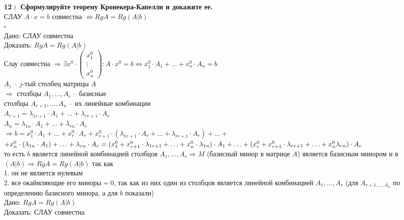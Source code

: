 \documentclass[a4paper,12pt]{article}
\newcommand*{\hm}[1]{#1\nobreak\discretionary{}
{\hbox{$\mathsurround=0pt #1$}}{}}
\begin{document}
    \textbf{12$\left.\right)$ Сформулируйте теорему Кронекера-Капелли и докажите ее.}\\
    СЛАУ $A\cdot x=b$ совместна $\Leftrightarrow RgA=Rg(A|b)$\\
    $\square$\\
    Дано: СЛАУ совместна\\
    Доказать: $RgA=Rg(A|b)$\\
    Слау совместна $\Rightarrow\exists x^0\cdot\begin{pmatrix}
                                                   x_1^0  \\
                                                   \vdots \\
                                                   x_n^0
    \end{pmatrix}: A\cdot x^0=b\Leftrightarrow x_1^0\cdot A_1+\ldots+x_n^0\cdot A_n=b$\\
    $A_j$ -- $j$-тый столбец матрицы $A$\\
    $\Rightarrow$ столбцы $A_1, \ldots, A_r$ -- базисные\\
    столбцы $A_{r+1},\ldots, A_n$ -- их линейные комбинации\\
    $A_{r+1}=\lambda_{1r+1}\cdot A_1+\ldots+\lambda_{rr+1}\cdot A_r$\\
    $A_n=\lambda_{1n}\cdot A_1+\ldots+\lambda_{rn}\cdot A_r$\\
    $\Rightarrow b=x_1^0\cdot A_1+\ldots +x_r^0\cdot A_r+x^0_{r+1}\cdot(\lambda_{1r+1}\cdot A_r+\ldots+\lambda_{rr+1}\cdot A_r)+\ldots+$\\$+x_n^0\cdot(\lambda_{1n}\cdot A_1)+\ldots+\lambda_{rn}\cdot A_r=(x_1^0+x_{r+1}^0\cdot \lambda_{1r+1}+\ldots+x_n^0\cdot \lambda_{1n})\cdot A_1\hm{+}\ldots+(x_r^0+x_{r+1}^0\cdot \lambda_{rr+1}+\ldots+x_n^0\lambda_{rn})\cdot A_r$\\
    то есть $b$ является линейной комбинацией столбцов $A_1, \ldots, A_r\Rightarrow M$ (базисный минор в матрице $A$) является базисным минором и в $(A|b)\Rightarrow RgA=Rg(A|b)$ так как\\ 1. он не является нулевым\\
    2. все окаймляющие его миноры$=0$, так как из них один из столбцов является линейной комбинацией $A_1, \ldots, A_r$ (для $A_{r+1, \ldots, A_n}$ по определению базисного минора, а для $b$ показали)\\
    Дано: $RgA=Rg(A|b)$\\
    Доказать: СЛАУ совместна\\
\end{document}
